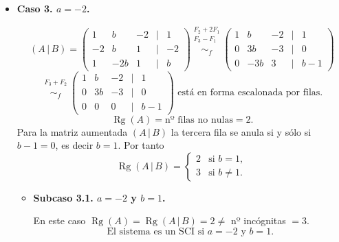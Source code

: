 \documentclass[a4paper,12pt]{article}
\begin{document}
\begin{ejercicio}[title=Ejercicio 31]
\begin{itemize}
\begin{itemize}
Se tiene:
\[
\operatorname{Rg}(A)=\operatorname{Rg}(A\,|\,B)=1 \neq \text{nº incógnitas}=3.
\]
\[
\boxed{\text{El sistema es un SCI si } a=1 \text{ y } b=1.}
\]

Resolvemos:
\[
\begin{cases}
    x+y+z=1
\end{cases}
\]

Tomamos \(y=\lambda_1\), \(z=\lambda_2\) parámetros libres. Entonces:
\[
x=1-\lambda_1-\lambda_2.
\]
\[
\boxed{
x = 1-\lambda_1-\lambda_2,\qquad
y=\lambda_1,\qquad
z=\lambda_2,\qquad
\lambda_1,\lambda_2\in\mathbb{R}.
}
\]

\item \textbf{Subcaso 2.2. $a=1$ y $b\neq 1$.}

En este caso:
\[
\operatorname{Rg}(A)=1 \neq \operatorname{Rg}(A\,|\,B)=2.
\]
\[
\boxed{\text{El sistema es un SI si } a=1 \text{ y } b\neq 1.}
\]

\end{itemize}

\item \textbf{Caso 3. \(a=-2\).}

\[
(A\,|\,B)=
\begin{pmatrix}
1 & b & -2 &\Big|& 1\\
-2 & b & 1 &\Big|& -2\\
1 & -2b & 1 &\Big|& b
\end{pmatrix}
\overset{\substack{F_2+2F_1\\F_3-F_1\\{}}}{\sim_f}
\begin{pmatrix}
1 & b & -2 &\Big|& 1\\
0 & 3b & -3 &\Big|& 0\\
0 & -3b & 3 &\Big|& b-1
\end{pmatrix}
\]
\[
\overset{\substack{F_3 + F_2\\{}}}{\sim_f}
\begin{pmatrix}
1 & b & -2 &\Big|& 1\\
0 & 3b & -3 &\Big|& 0\\
0 & 0 & 0 &\Big|& b-1
\end{pmatrix}
\text{ está en forma escalonada por filas.}
\]
\[
\operatorname{Rg}(A)=\text{nº filas no nulas}=2.
\]
Para la matriz aumentada \((A\,|\,B)\) la tercera fila se anula si y sólo si \(b-1=0\), es decir \(b=1\). Por tanto
\[
\operatorname{Rg}(A\,|\,B)=
\begin{cases}
2 & \text{si } b=1,\\[4pt]
3 & \text{si } b\neq 1.
\end{cases}
\]

\begin{itemize}
\item \textbf{Subcaso 3.1. \(a=-2\) y \(b=1\).}

En este caso \(\operatorname{Rg}(A)=\operatorname{Rg}(A\,|\,B)=2 \neq\) nº incógnitas \(=3\).  
\[
\boxed{\text{El sistema es un SCI si } a=-2 \text{ y } b=1.}
\]
\end{itemize}
\end{itemize}
\end{ejercicio}
\end{document}
